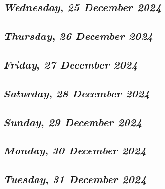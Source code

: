 \def\day{\textit{25 December 2024}}
\def\weekday{\textit{Wednesday}}
\subsection*{\weekday, \day}

\def\day{\textit{26 December 2024}}
\def\weekday{\textit{Thursday}}
\subsection*{\weekday, \day}

\def\day{\textit{27 December 2024}}
\def\weekday{\textit{Friday}}
\subsection*{\weekday, \day}

\def\day{\textit{28 December 2024}}
\def\weekday{\textit{Saturday}}
\subsection*{\weekday, \day}

\def\day{\textit{29 December 2024}}
\def\weekday{\textit{Sunday}}
\subsection*{\weekday, \day}

\def\day{\textit{30 December 2024}}
\def\weekday{\textit{Monday}}
\subsection*{\weekday, \day}

\def\day{\textit{31 December 2024}}
\def\weekday{\textit{Tuesday}}
\subsection*{\weekday, \day}
